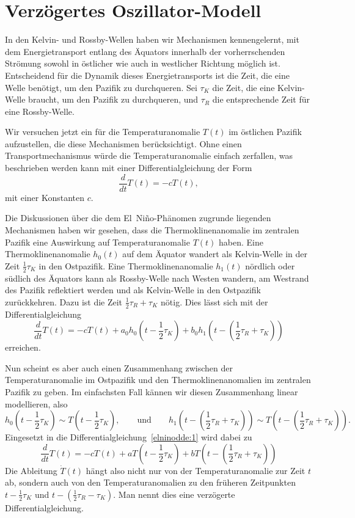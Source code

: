 %
%
%
\section{Verzögertes Oszillator-Modell\label{section:dde-nino}}
In den Kelvin- und Rossby-Wellen haben wir Mechanismen kennengelernt,
mit dem Energietransport entlang des Äquators innerhalb der vorherrschenden
Strömung sowohl in östlicher wie auch in westlicher Richtung möglich ist.
Entscheidend für die Dynamik dieses Energietransports ist die Zeit,
die eine Welle benötigt, um den Pazifik zu durchqueren.
Sei $\tau_K$ die Zeit, die eine Kelvin-Welle braucht, um den Pazifik
zu durchqueren, und $\tau_R$ die entsprechende Zeit für eine Rossby-Welle.

Wir versuchen jetzt ein für die Temperaturanomalie $T(t)$ im östlichen
Pazifik aufzustellen, die diese Mechanismen berücksichtigt.
Ohne einen Transportmechanismus würde die Temperaturanomalie einfach
zerfallen, was beschrieben werden kann mit einer Differentialgleichung
der Form
\[
\frac{d}{dt}T(t)
=
-cT(t),
\]
mit einer Konstanten $c$.

Die Diskussionen über die dem El~Niño-Phänomen zugrunde liegenden
Mechanismen haben wir gesehen, dass die Thermoklinenanomalie im
zentralen Pazifik eine Auswirkung auf Temperaturanomalie $T(t)$ haben.
Eine Thermoklinenanomalie $h_0(t)$ auf dem Äquator wandert als
Kelvin-Welle in der Zeit $\frac12\tau_K$ in den Ostpazifik.
Eine Thermoklinenanomalie $h_1(t)$ nördlich oder südlich des Äquators
kann als Rossby-Welle nach Westen wandern, am Westrand des Pazifik
reflektiert werden und als Kelvin-Welle in den Ostpazifik zurückkehren.
Dazu ist die Zeit $\frac12\tau_R+\tau_K$ nötig.
Dies lässt sich mit der Differentialgleichung
\begin{equation}
\frac{d}{dt}T(t)
=
-cT(t) + a_0h_0(t-\frac12\tau_K) + b_0h_1(t-(\frac12\tau_R+\tau_K))
\label{elninodde:1}
\end{equation}
erreichen.

Nun scheint es aber auch einen Zusammenhang zwischen der Temperaturanomalie
im Ostpazifik und den Thermoklinenanomalien im zentralen Pazifik zu geben.
Im einfachsten Fall kännen wir diesen Zusammenhang linear modellieren,
also 
\[
h_0(t-\frac12\tau_K)
\sim
T(t-\frac12\tau_K),
\qquad
\text{und}
\qquad
h_1(t-(\frac12\tau_R+\tau_K))
\sim
T(t-(\frac12\tau_R+\tau_K)).
\]
Eingesetzt in die Differentialgleichung~\eqref{elninodde:1} wird dabei zu
\begin{equation}
\frac{d}{dt}T(t)
=
-cT(t) + aT(t-\frac12\tau_K) + bT(t-(\frac12\tau_R+\tau_K))
\label{elninodde:2}
\end{equation}
Die Ableitung $\dot T(t)$ hängt also nicht nur von der Temperaturanomalie
zur Zeit $t$ ab, sondern auch von den Temperaturanomalien zu den
früheren Zeitpunkten $t-\frac12\tau_K$ und $t-(\frac12\tau_R-\tau_K)$.
Man nennt dies eine verzögerte Differentialgleichung.

